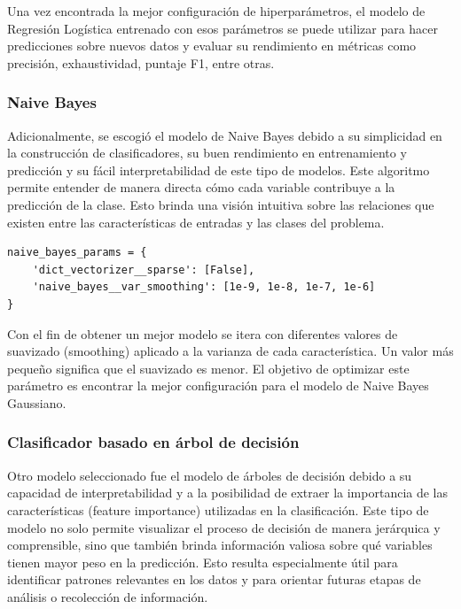 \documentclass[11pt,a4paper,spanish]{book}
\numberwithin{equation}{chapter}
\numberwithin{figure}{chapter}
\begin{document}
Una vez encontrada la mejor configuración de hiperparámetros, el modelo de Regresión 
Logística entrenado con esos parámetros se puede utilizar para hacer predicciones sobre 
nuevos datos y evaluar su rendimiento en métricas como precisión, exhaustividad, 
puntaje F1, entre otras.


\subsubsection{Naive Bayes}

Adicionalmente, se escogió el modelo de Naive Bayes debido a su simplicidad en la 
construcción de clasificadores, su buen rendimiento en entrenamiento y predicción y su 
fácil interpretabilidad de este tipo de modelos. Este algoritmo permite entender de 
manera directa cómo cada variable contribuye a la predicción de la clase. Esto brinda 
una visión intuitiva sobre las relaciones que existen entre las características de 
entradas y las clases del problema.


\vspace{5mm}
\begin{lstlisting}
naive_bayes_params = {
    'dict_vectorizer__sparse': [False],
    'naive_bayes__var_smoothing': [1e-9, 1e-8, 1e-7, 1e-6]
}
\end{lstlisting}


Con el fin de obtener un mejor modelo se itera con diferentes valores de suavizado 
(smoothing) aplicado a la varianza de cada característica. Un valor más pequeño 
significa que el suavizado es menor.  El objetivo de optimizar este parámetro es 
encontrar la mejor configuración para el modelo de Naive Bayes Gaussiano.


\subsubsection{Clasificador basado en árbol de decisión}

Otro modelo seleccionado fue el modelo de árboles de decisión debido a su capacidad de 
interpretabilidad y a la posibilidad de extraer la importancia de las características 
(feature importance) utilizadas en la clasificación. Este tipo de modelo no solo permite 
visualizar el proceso de decisión de manera jerárquica y comprensible, sino que también 
brinda información valiosa sobre qué variables tienen mayor peso en la predicción. 
Esto resulta especialmente útil para identificar patrones relevantes en los datos y 
para orientar futuras etapas de análisis o recolección de información.
\end{document}
